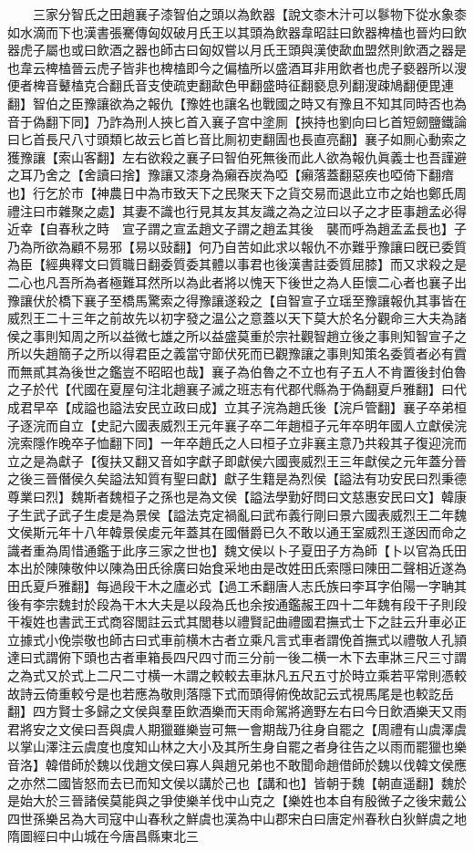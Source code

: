　　三家分智氏之田趙襄子漆智伯之頭以為飲器【說文桼木汁可以鬖物下從水象桼如水滴而下也漢書張騫傳匈奴破月氏王以其頭為飲器韋昭註曰飲器椑榼也晉灼曰飲器虎子屬也或曰飲酒之器也師古曰匈奴嘗以月氏王頭與漢使歃血盟然則飲酒之器是也韋云椑榼晉云虎子皆非也椑榼即今之偏榼所以盛酒耳非用飲者也虎子褻器所以溲便者椑音鼙榼克合翻氏音支使疏吏翻歃色甲翻盛時征翻褻息列翻溲疎鳩翻便毘連翻】智伯之臣豫讓欲為之報仇【豫姓也讓名也戰國之時又有豫且不知其同時否也為音于偽翻下同】乃詐為刑人挾匕首入襄子宫中塗厠【挾持也劉向曰匕首短劒鹽鐵論曰匕首長尺八寸頭類匕故云匕首匕音比厠初吏翻圊也長直亮翻】襄子如厠心動索之獲豫讓【索山客翻】左右欲殺之襄子曰智伯死無後而此人欲為報仇眞義士也吾謹避之耳乃舍之【舍讀曰捨】豫讓又漆身為癩吞炭為啞【癩落蓋翻惡疾也啞倚下翻瘖也】行乞於市【神農日中為市致天下之民聚天下之貨交易而退此立市之始也鄭氏周禮注曰市雜聚之處】其妻不識也行見其友其友識之為之泣曰以子之才臣事趙孟必得近幸【自春秋之時　宣子謂之宣孟趙文子謂之趙孟其後　襲而呼為趙孟孟長也】子乃為所欲為顧不易邪【易以䜴翻】何乃自苦如此求以報仇不亦難乎豫讓曰旣已委質為臣【經典釋文曰質職日翻委質委其體以事君也後漢書註委質屈膝】而又求殺之是二心也凡吾所為者極難耳然所以為此者將以愧天下後世之為人臣懷二心者也襄子出豫讓伏於橋下襄子至橋馬驚索之得豫讓遂殺之【自智宣子立瑶至豫讓報仇其事皆在威烈王二十三年之前故先以初字發之温公之意蓋以天下莫大於名分觀命三大夫為諸侯之事則知周之所以益微七雄之所以益盛莫重於宗社觀智趙立後之事則知智宣子之所以失趙簡子之所以得君臣之義當守節伏死而已觀豫讓之事則知策名委質者必有霣而無貳其為後世之鑑豈不昭昭也哉】襄子為伯魯之不立也有子五人不肯置後封伯魯之子於代【代國在夏屋句注北趙襄子滅之班志有代郡代縣為于偽翻夏戶雅翻】曰代成君早卒【成謚也謚法安民立政曰成】立其子浣為趙氏後【浣戶管翻】襄子卒弟桓子逐浣而自立【史記六國表威烈王元年襄子卒二年趙桓子元年卒明年國人立獻侯浣浣索隱作晚卒子恤翻下同】一年卒趙氏之人曰桓子立非襄主意乃共殺其子復迎浣而立之是為獻子【復扶又翻又音如字獻子即獻侯六國喪威烈王三年獻侯之元年蓋分晉之後三晉僭侯久矣謚法知質有聖曰獻】獻子生籍是為烈侯【謚法有功安民曰烈秉德尊業曰烈】魏斯者魏桓子之孫也是為文侯【謚法學勤好問曰文慈惠安民曰文】韓康子生武子武子生䖍是為景侯【謚法克定禍亂曰武布義行剛曰景六國表威烈王二年魏文侯斯元年十八年韓景侯䖍元年蓋其在國僭爵已久不敢以通王室威烈王遂因而命之識者重為周惜通鑑于此序三家之世也】魏文侯以卜子夏田子方為師【卜以官為氏田本出於陳陳敬仲以陳為田氏徐廣曰始食采地由是改姓田氏索隱曰陳田二聲相近遂為田氏夏戶雅翻】每過段干木之廬必式【過工禾翻唐人志氏族曰李耳字伯陽一字聃其後有李宗魏封於段為干木大夫是以段為氏也余按通鑑赧王四十二年魏有段干子則段干複姓也書武王式商容閭註云式其閭巷以禮賢記曲禮國君撫式士下之註云升車必正立據式小俛崇敬也師古曰式車前横木古者立乘凡言式車者謂俛首撫式以禮敬人孔頴達曰式謂俯下頭也古者車箱長四尺四寸而三分前一後二横一木下去車牀三尺三寸謂之為式又於式上二尺二寸横一木謂之較較去車牀凡五尺五寸於時立乘若平常則憑較故詩云倚重較兮是也若應為敬則落隱下式而頭得俯俛故記云式視馬尾是也較訖岳翻】四方賢士多歸之文侯與羣臣飲酒樂而天雨命駕將適野左右曰今日飲酒樂天又雨君將安之文侯曰吾與虞人期獵雖樂豈可無一會期哉乃往身自罷之【周禮有山虞澤虞以掌山澤注云虞度也度知山林之大小及其所生身自罷之者身往告之以雨而罷獵也樂音洛】韓借師於魏以伐趙文侯曰寡人與趙兄弟也不敢聞命趙借師於魏以伐韓文侯應之亦然二國皆怒而去已而知文侯以講於己也【講和也】皆朝于魏【朝直遥翻】魏於是始大於三晉諸侯莫能與之爭使樂羊伐中山克之【樂姓也本自有殷微子之後宋戴公四世孫樂呂為大司寇中山春秋之鮮虞也漢為中山郡宋白曰唐定州春秋白狄鮮虞之地隋圖經曰中山城在今唐昌縣東北三